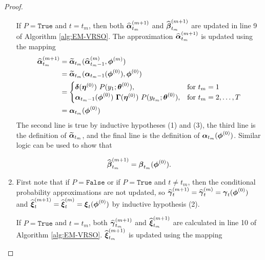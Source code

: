 \begin{proof}
\begin{enumerate}
        If $P = \texttt{True}$ and $t = t_m$, then both $\widehat {\boldsymbol{\alpha}}^{(m+1)}_{t_m}$ and $\widehat {\boldsymbol{\beta}}^{(m+1)}_{t_m}$ are updated in line 9 of Algorithm \ref{alg:EM-VRSO}. The approximation $\widehat {\boldsymbol{\alpha}}^{(m+1)}_{t_m}$ is updated using the mapping 
        \begin{align}
            \widehat {\boldsymbol{\alpha}}^{(m+1)}_{t_m} &= \widetilde {\boldsymbol{\alpha}}_{t_m}(\widehat {\boldsymbol{\alpha}}^{(m)}_{t_m-1},\boldsymbol{\phi}^{(m)}) \nonumber \\
            &= \widetilde {\boldsymbol{\alpha}}_{t_m}(\boldsymbol{\alpha}_{t_m-1}(\boldsymbol{\phi}^{(0)}),\boldsymbol{\phi}^{(0)}) \nonumber \\
            &= 
            \begin{cases}
                \boldsymbol{\delta}(\boldsymbol{\eta}^{(0)}) ~ P(y_1;\boldsymbol{\theta}^{(0)}), & \text{for } t_m = 1 \\
                \boldsymbol{\alpha}_{t_m-1}(\boldsymbol{\phi}^{(0)}) ~ \boldsymbol{\Gamma}(\boldsymbol{\eta}^{(0)}) ~P(y_{t_m};\boldsymbol{\theta}^{(0)}), & \text{for } t_m = 2,\ldots,T
            \end{cases} \nonumber \\
            &= \boldsymbol{\alpha}_{t_m}(\boldsymbol{\phi}^{(0)}) \label{eqn:a_inductive_step}
        \end{align}
        The second line is true by inductive hypotheses (1) and (3), the third line is the definition of $\widetilde {\boldsymbol{\alpha}}_{t_m}$, and the final line is the definition of $\boldsymbol{\alpha}_{t_m}(\boldsymbol{\phi}^{(0)})$. Similar logic can be used to show that 
        
        \begin{equation}
            \widehat {\boldsymbol{\beta}}^{(m+1)}_{t_m} = \boldsymbol{\beta}_{t_m}(\boldsymbol{\phi}^{(0)}). \label{eqn:b_inductive_step}
        \end{equation}
        \item First note that if $P = \texttt{False}$ or if $P = \texttt{True}$ and $t \neq t_m$, then the conditional probability approximations are not updated, so $\widehat {\boldsymbol{\gamma}}^{(m+1)}_t = \widehat {\boldsymbol{\gamma}}^{(m)}_t = \boldsymbol{\gamma}_t(\boldsymbol{\phi}^{(0)})$ and $\widehat {\boldsymbol{\xi}}^{(m+1)}_t = \widehat {\boldsymbol{\xi}}^{(m)}_t = \boldsymbol{\xi}_t(\boldsymbol{\phi}^{(0)})$ by inductive hypothesis (2).
        
        If $P = \texttt{True}$ and $t = t_m$, both $\widehat {\boldsymbol{\gamma}}^{(m+1)}_{t_m}$ and $\widehat {\boldsymbol{\xi}}^{(m+1)}_{t_m}$ are calculated in line 10 of Algorithm \ref{alg:EM-VRSO}. $\widehat {\boldsymbol{\xi}}^{(m+1)}_{t_m}$ is updated using the mapping 
        

\end{enumerate}
\end{proof}
